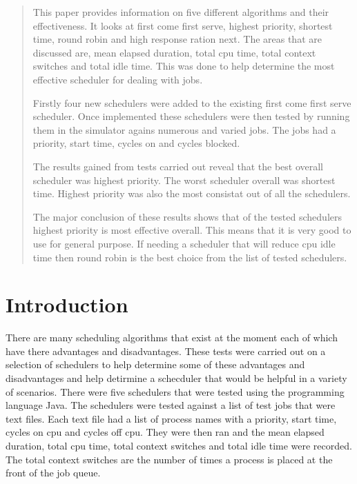 \documentclass{acm_proc_article-sp}
\begin{document}
\maketitle
\begin{abstract}
This paper provides information on five different algorithms and their 
effectiveness. It looks at first come first serve, highest priority, shortest time, round robin and high response ration next. The areas that are discussed are, mean elapsed duration, total cpu time, total context switches and total idle time. This was done to help determine the most effective scheduler for dealing with jobs.

Firstly four new schedulers were added to the existing first come first serve scheduler. Once implemented these schedulers were then tested by running them in the simulator agains numerous and varied jobs. The jobs had a priority, start time, cycles on and cycles blocked. 

The results gained from tests carried out reveal that the best overall scheduler was highest priority. The worst scheduler overall was shortest time. Highest priority was also the most consistat out of all the schedulers.

The major conclusion of these results shows that of the tested schedulers highest priority is most effective overall. This means that it is very good to use for general purpose. If needing a scheduler that will reduce cpu idle time then round robin is the best choice from the list of tested schedulers.
\end{abstract}




\section{Introduction}
There are many scheduling algorithms that exist at the moment each of which have there advantages and disadvantages. These tests were carried out on a selection of schedulers to help determine some of these advantages and disadvantages and help detirmine a schecduler that would be helpful in a variety of scenarios. 
	There were five schedulers that were tested using the programming language Java. The schedulers were tested against a list of test jobs that were text files. Each text file had a list of process names with a priority, start time, cycles on cpu and cycles off cpu. They were then ran and the mean elapsed duration, total cpu time, total context switches and total idle time were recorded. The total context switches are the number of times a process is placed at the front of the job queue. 
\end{document}
